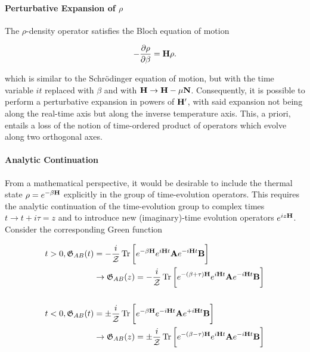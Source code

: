 \paragraph{Perturbative Expansion of $\rho$}

The $\rho$-density operator satisfies the Bloch equation of motion 

\begin{equation}
    -\frac{\partial \rho}{\partial \beta} = {\bf H} \rho. 
\end{equation}

which is similar to the Schr\"odinger equation of motion, but with the time variable $it$ replaced with $\beta$ and with ${\bf H} \rightarrow {\bf H} - \mu {\bf N}$. Consequently, it is possible to perform a perturbative expansion in powers of ${\bf H}'$, with said expansion not being along the real-time axis but along the inverse temperature axis. This, a priori, entails a loss of the notion of time-ordered product of operators which evolve along two orthogonal axes. \\

\paragraph{Analytic Continuation}

From a mathematical perspective, it would be desirable to include the thermal state $\rho = e^{-\beta {\bf H}}$ explicitly in the group of time-evolution operators. This requires the analytic continuation of the time-evolution group to complex times $t \rightarrow t + i\tau = z$ and to introduce new (imaginary)-time evolution operators $e^{iz {\bf H}}$. Consider the corresponding Green function

\begin{equation}
    \begin{split}
        t>0, \mathfrak{G}_{AB}(t) &= - \frac{i}{\mathcal{Z}} \Tr \bigg[e^{-\beta {\bf H}} e^{i {\bf H} t} {\bf A} e^{-i {\bf H} t} {\bf B}\bigg] \\
        & \rightarrow \mathfrak{G}_{AB}(z) = - \frac{i}{\mathcal{Z}} \Tr \bigg[e^{-(\beta+\tau) {\bf H}} e^{i {\bf H} t} {\bf A} e^{-i {\bf H} t} {\bf B}\bigg] \\
        \\
        t<0, \mathfrak{G}_{AB}(t) &= \pm\frac{i}{\mathcal{Z}} \Tr \bigg[e^{-\beta {\bf H}} e^{-i {\bf H} t} {\bf A} e^{+i {\bf H} t} {\bf B}\bigg] \\
        & \rightarrow \mathfrak{G}_{AB}(z) = \pm \frac{i}{\mathcal{Z}} \Tr \bigg[e^{-(\beta-\tau) {\bf H}} e^{i {\bf H} t} {\bf A} e^{-i {\bf H} t} {\bf B}\bigg] \\
    \end{split}
\end{equation}

